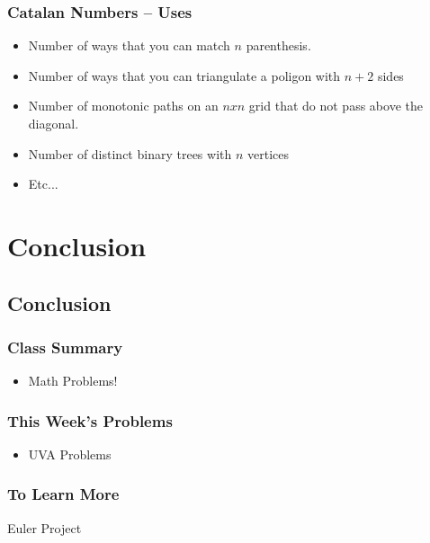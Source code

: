 \documentclass{beamer}
\begin{document}
\begin{frame}
  \frametitle{Catalan Numbers -- Uses}
  \begin{itemize}
    \item Number of ways that you can match $n$ parenthesis.
    \item Number of ways that you can triangulate a poligon with $n+2$ sides
    \item Number of monotonic paths on an $nxn$ grid that do not pass above
      the diagonal.
    \item Number of distinct binary trees with $n$ vertices
    \item Etc...
  \end{itemize}
\end{frame}


\section{Conclusion}
\subsection{Conclusion}
\begin{frame}
  \frametitle{Class Summary}
  \begin{itemize}
  \item Math Problems!
  \end{itemize}
\end{frame}

\begin{frame}
  \frametitle{This Week's Problems}
  {\smaller
  \begin{itemize}
  \item UVA Problems
  \end{itemize}}
\end{frame}

\begin{frame}
  \frametitle{To Learn More}
  Euler Project
\end{frame}
\end{document}
